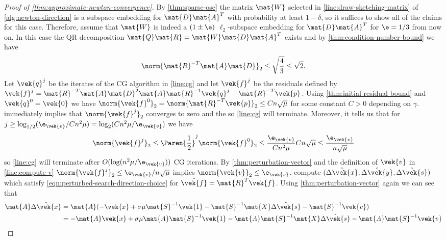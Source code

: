 \begin{proof}[Proof of \cref{thm:approximate-newton-convergence}]
  By \cref{thm:sparse-ose} the matrix \(\mat{W}\) selected in \cref{line:draw-sketching-matrix} of \cref{alg:newton-direction} is a subspace embedding for \(\mat{D}\mat{A}^T\) with probability at least \(1 - \delta\), so it suffices to show all of the claims for this case.
  Therefore, assume that \(\mat{W}\) is indeed a \((1 \pm \e)\) \(\ell_2\)-subspace embedding for \(\mat{D}\mat{A}^T\) for \(\e = 1/3\) from now on.
  In this case the QR decomposition \(\mat{Q}\mat{R} = \mat{W}\mat{D}\mat{A}^T\) exists and by \cref{thm:condition-number-bound} we have
  \[\norm{\mat{R}^{-T}\mat{A}\mat{D}}_2 \leq \sqrt{\frac{4}{3}} \leq \sqrt{2}.\]
  Let \(\vek{q}^j\) be the iterates of the CG algorithm in \cref{line:cg} and let \(\vek{f}^j\) be the residuals defined by
\( \vek{f}^j = \mat{R}^{-T} \mat{A} \mat{D}^2 \mat{A} \mat{R}^{-1} \vek{q}^j - \mat{R}^{-T} \vek{p} \).
  Using \cref{thm:initial-residual-bound} and \(\vek{q}^0 = \vek{0}\) we have \(\norm{\vek{f}^0}_2 = \norm{\mat{R}^{-T} \vek{p}}_2 \leq Cn\sqrt{\mu}\) for some constant \(C > 0\) depending on \(\gamma\).
   immediately implies that \(\norm{\vek{f}^j}_2\) converges to zero and the so \cref{line:cg} will terminate.
  Moreover, it tells us that for \(j \geq \log_{1/2}(\e_{\vek{v}}/C n^2 \mu) = \log_2(C n^2 \mu / \e_{\vek{v}})\) we have
  \[ \norm{\vek{f}^j}_2 \leq \Paren{\frac{1}{2}}^j \norm{\vek{f}^0}_2 \leq \frac{\e_{\vek{v}}}{C n^2 \mu} C n \sqrt{\mu} \leq \frac{\e_{\vek{v}}}{n \sqrt{\mu}} \]
  so \cref{line:cg} will terminate after \(O(\log(n^2 \mu / \e_{\vek{v}}))\) CG iterations.
  By \cref{thm:perturbation-vector} and the definition of \(\vek{v}\) in \cref{line:compute-v} \(\norm{\vek{f}^j}_2 \leq \e_{\vek{v}}/n\sqrt{\mu}\) implies \(\norm{\vek{v}}_2 \leq \e_{\vek{v}}\).
   compute \((\hat{\Delta\vek{x}}, \hat{\Delta\vek{y}}, \hat{\Delta\vek{s}})\) which satisfy \cref{eqn:perturbed-search-direction-choice} for \(\tilde{\vek{f}} = \mat{R}^T \vek{f}\).
  Using \cref{thm:perturbation-vector} again we can see that
  \begin{align*}
    \mat{A}\hat{\Delta\vek{x}} 
    &= \mat{A} (-\vek{x} + \sigma \mu \mat{S}^{-1}\vek{1} - \mat{S}^{-1}\mat{X}\hat{\Delta\vek{s}} - \mat{S}^{-1}\vek{v}) \\
    &= -\mat{A}\vek{x} + \sigma \mu \mat{A}\mat{S}^{-1}\vek{1} - \mat{A}\mat{S}^{-1}\mat{X}\hat{\Delta\vek{s}} - \mat{A}\mat{S}^{-1}\vek{v} \\

\end{align*}
\end{proof}
